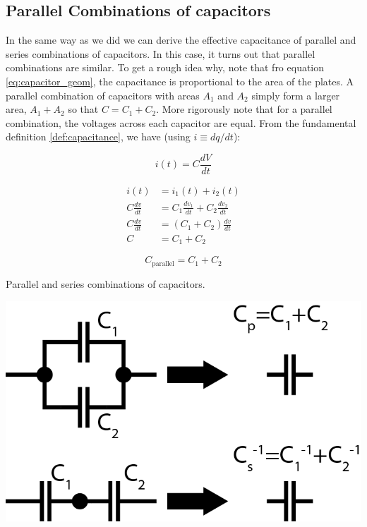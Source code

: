 \documentclass{tufte-book}
\begin{document}
\subsection{Parallel Combinations of capacitors}
In the same way as we did we can derive the effective capacitance of parallel and series combinations of capacitors. In this case, it turns out that parallel combinations are similar. To get a rough idea why, note that fro equation \ref{eq:capacitor_geom}, the capacitance is proportional to the area of the plates. A parallel combination of capacitors with  areas $A_1 $ and $A_2$ simply form a larger area, $A_1+A_2$ so that $C  = C_1+C_2$. More rigorously note that for a parallel combination, the voltages across each capacitor are equal. From the fundamental definition \ref{def:capacitance}, we have (using $i\equiv dq/dt$):

\begin{equation}\label{eq:cap_AC}
i(t) = C\frac{dV}{dt}
\end{equation}


\begin{align*}
i(t) &= i_1(t) + i_2(t) \\
C\frac{dv}{dt} &= C_1\frac{dv_1}{dt} + C_2\frac{dv_2}{dt} \\
C\frac{dv}{dt}&= \left(C_1+C_2\right)\frac{dv}{dt} \\
C &= C_1+C_2
\end{align*}

\begin{equation}\label{eq:parallel_cap}
\boxed{C_{\text{parallel}} = C_1+C_2}
\end{equation}


\begin{marginfigure}
\caption{Parallel and series combinations of capacitors.}
\label{fig:cap_netwerx}
\includegraphics[]{cap_netwerx}
\end{marginfigure}
\end{document}
